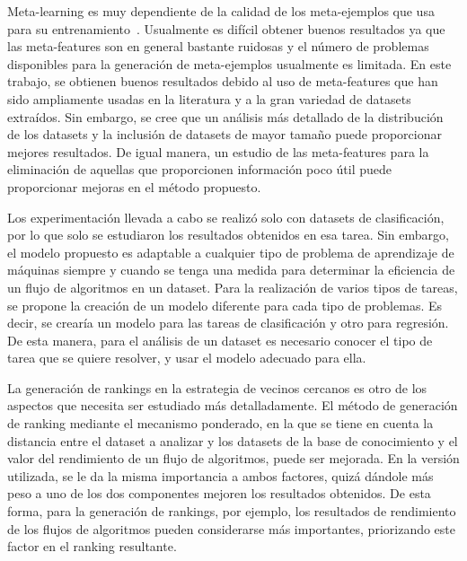 Meta-learning es muy dependiente de la calidad de los meta-ejemplos que usa para su entrenamiento~\cite{gomes2012combining}. Usualmente es difícil obtener buenos resultados ya que las meta-features son en general bastante ruidosas y el número de problemas disponibles para la generación de meta-ejemplos usualmente es limitada. En este trabajo, se obtienen buenos resultados debido al uso de meta-features que han sido ampliamente usadas en la literatura y a la gran variedad de datasets extraídos. Sin embargo, se cree que un análisis más detallado de la distribución de los datasets y la inclusión de datasets de mayor tamaño puede proporcionar mejores resultados. De igual manera, un estudio de las meta-features para la eliminación de aquellas que proporcionen información poco útil puede proporcionar mejoras en el método propuesto.

Los experimentación llevada a cabo se realizó solo con datasets de clasificación, por lo que solo se estudiaron los resultados obtenidos en esa tarea. Sin embargo, el modelo propuesto es adaptable a cualquier tipo de problema de aprendizaje de máquinas siempre y cuando se tenga una medida para determinar la eficiencia de un flujo de algoritmos en un dataset. Para la realización de varios tipos de tareas, se propone la creación de un modelo diferente para cada tipo de problemas. Es decir, se crearía un modelo para las tareas de clasificación y otro para regresión. De esta manera, para el análisis de un dataset es necesario conocer el tipo de tarea que se quiere resolver, y usar el modelo adecuado para ella.

La generación de rankings en la estrategia de vecinos cercanos es otro de los aspectos que necesita ser estudiado más detalladamente. El método de generación de ranking mediante el mecanismo ponderado, en la que se tiene en cuenta la distancia entre el dataset a analizar y los datasets de la base de conocimiento y el valor del rendimiento de un flujo de algoritmos, puede ser mejorada. En la versión utilizada, se le da la misma importancia a ambos factores, quizá dándole más peso a uno de los dos componentes mejoren los resultados obtenidos. De esta forma, para la generación de rankings, por ejemplo, los resultados de rendimiento de los flujos de algoritmos pueden considerarse más importantes, priorizando este factor en el ranking resultante.






